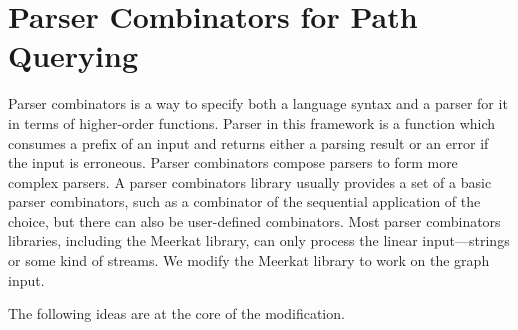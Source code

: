 \section{Parser Combinators for Path Querying}
\label{sec:combinators}

Parser combinators is a way to specify both a language syntax and a parser for it in terms of higher-order functions. 
Parser in this framework is a function which consumes a prefix of an input and returns either a parsing result or an error if the input is erroneous. 
Parser combinators compose parsers to form more complex parsers. 
A parser combinators library usually provides a set of a basic parser combinators, such as a combinator of the sequential application of the choice, but there can also be user-defined combinators.
Most parser combinators libraries, including the Meerkat library, can only process the linear input---strings or some kind of streams.
We modify the Meerkat library to work on the graph input.


The following ideas are at the core of the modification.


